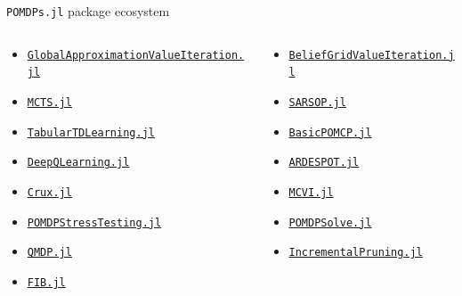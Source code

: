 \begin{frame}[fragile]{\texttt{POMDPs.jl} package ecosystem}
\begin{columns}[T,onlytextwidth]
\begin{column}{0.40\linewidth}
{\begin{itemize}
            \item {\color{julia_green}\href{https://github.com/JuliaPOMDP/GlobalApproximationValueIteration.jl}{\texttt{GlobalApproximationValueIteration.jl}}}
            \item {\color{julia_purple}\href{https://github.com/JuliaPOMDP/MCTS.jl}{\texttt{MCTS.jl}}}
            \item {\color{julia_blue}\href{https://github.com/JuliaPOMDP/TabularTDLearning.jl}{\texttt{TabularTDLearning.jl}}}
            \item {\color{julia_red}\href{https://github.com/JuliaPOMDP/DeepQLearning.jl}{\texttt{DeepQLearning.jl}}}
            \item {\color{julia_green}\href{https://github.com/ancorso/Crux.jl}{\texttt{Crux.jl}}}
            \item {\color{julia_purple}\href{https://github.com/sisl/POMDPStressTesting.jl}{\texttt{POMDPStressTesting.jl}}}
            \item {\color{julia_blue}\href{https://github.com/JuliaPOMDP/DiscreteValueIteration.jl}{\texttt{QMDP.jl}}}
            \item {\color{julia_red}\href{https://github.com/JuliaPOMDP/LocalApproximationValueIteration.jl}{\texttt{FIB.jl}}}
        \end{itemize}
        }
    \end{column}
    \begin{column}{0.32\linewidth}
        {\scriptsize
        \begin{itemize}
            \item {\color{julia_green}\href{https://github.com/JuliaPOMDP/GlobalApproximationValueIteration.jl}{\texttt{BeliefGridValueIteration.jl}}}
            \item {\color{julia_purple}\href{https://github.com/JuliaPOMDP/MCTS.jl}{\texttt{SARSOP.jl}}}
            \item {\color{julia_blue}\href{https://github.com/JuliaPOMDP/TabularTDLearning.jl}{\texttt{BasicPOMCP.jl}}}
            \item {\color{julia_red}\href{https://github.com/JuliaPOMDP/DeepQLearning.jl}{\texttt{ARDESPOT.jl}}}
            \item {\color{julia_green}\href{https://github.com/JuliaPOMDP/Crux.jl}{\texttt{MCVI.jl}}}
            \item {\color{julia_purple}\href{https://github.com/JuliaPOMDP/POMDPStressTesting.jl}{\texttt{POMDPSolve.jl}}}
            \item {\color{julia_blue}\href{https://github.com/JuliaPOMDP/TabularTDLearning.jl}{\texttt{IncrementalPruning.jl}}}

\end{itemize}}
\end{column}
\end{columns}
\end{frame}
